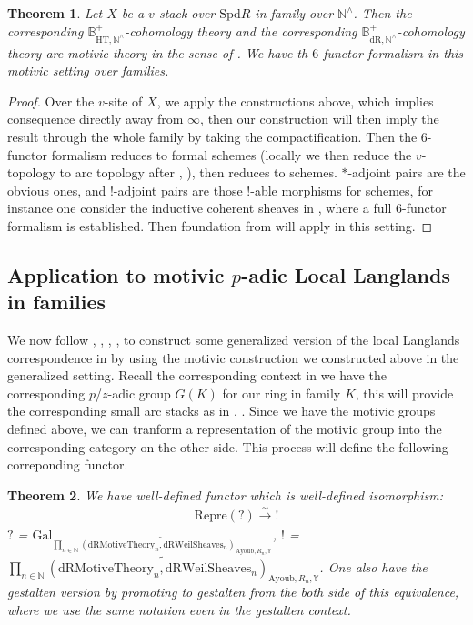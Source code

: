 \documentclass[12pt]{article}
\newtheorem{theorem}{Theorem}
\theoremstyle{definition}
\begin{document}
\begin{theorem}
Let $X$ be a $v$-stack over $\mathrm{Spd}R$ in family over $\mathbb{N}^\wedge$. Then the corresponding $\mathbb{B}_{\mathrm{HT},\mathbb{N}^\wedge}^+$-cohomology theory and the corresponding $\mathbb{B}_{\mathrm{dR},\mathbb{N}^\wedge}^+$-cohomology theory are motivic theory in the sense of \cite{2A}. We have th $6$-functor formalism in this motivic setting over families. 
\end{theorem}

\begin{proof}
Over the $v$-site of $X$, we apply the constructions above, which implies consequence directly away from $\infty$, then our construction will then imply the result through the whole family by taking the compactification. Then the 6-functor formalism reduces to formal schemes (locally we then reduce the $v$-topology to arc topology after \cite{1S5}, \cite{1S6}), then reduces to schemes. $*$-adjoint pairs are the obvious ones, and $!$-adjoint pairs are those $!$-able morphisms for schemes, for instance one consider the inductive coherent sheaves in \cite{GRI}, \cite{GRII} where a full 6-functor formalism is established. Then foundation from \cite{2A} will apply in this setting.
\end{proof}


\subsection{Application to motivic $p$-adic Local Langlands in families} 

\noindent We now follow \cite{1S5}, \cite{1S6}, \cite{L1}, \cite{1FS}, \cite{2LH} to construct some generalized version of the local Langlands correspondence in \cite{1FS} by using the motivic construction we constructed above in the generalized setting. Recall the corresponding context in \cite{2LH} we have the corresponding $p$/$z$-adic group $G(K)$ for our ring in family $K$, this will provide the corresponding small arc stacks as in \cite{1S5}, \cite{1S6}. Since we have the motivic groups defined above, we can tranform a representation of the motivic group into the corresponding category on the other side. This process will define the following correponding functor.


\begin{theorem}
We have well-defined functor which is well-defined isomorphism:
\begin{align}
\mathrm{Repre}(?) \overset{\sim}{\rightarrow}  ! 
\end{align}
$?$ = $\mathrm{Gal}_{\widetilde{\prod_{n\in \mathbb{N}} (\mathrm{dRMotiveTheory}_{n}, \mathrm{dRWeilSheaves}_n)_{\mathrm{Ayoub}, R_n,\mathbb{Y}}}}$, $!$ = $\widetilde{\prod_{n\in \mathbb{N}} (\mathrm{dRMotiveTheory}_{n}, \mathrm{dRWeilSheaves}_n)_{\mathrm{Ayoub}, R_n,\mathbb{Y}}}$. One also have the gestalten version by promoting to gestalten from the both side of this equivalence, where we use the same notation even in the gestalten context.
\end{theorem}
\end{document}
